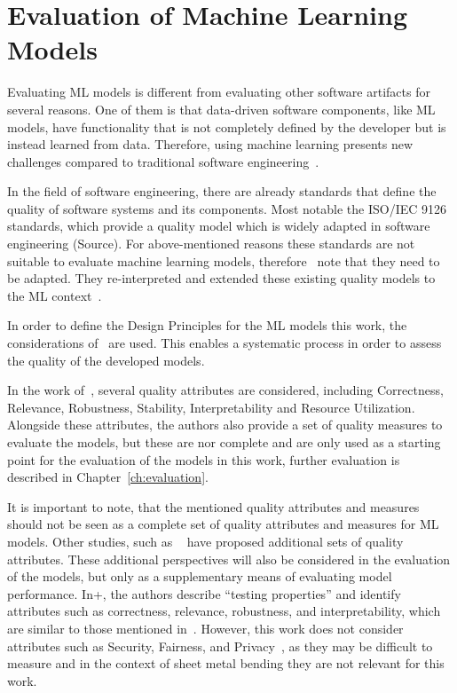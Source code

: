 \section{Evaluation of Machine Learning Models}\label{sec:evaluation-of-machine-learning-models}
Evaluating \ac{ML} models is different from evaluating other software artifacts for several reasons.
One of them is that data-driven software components, like \ac{ML} models, have functionality that
is not completely defined by the developer but is instead learned from data.
Therefore, using machine learning presents new challenges compared to traditional software
engineering~\cite[p. 2]{siebert2022construction}.

In the field of software engineering, there are already standards that define the quality of
software systems and its components.
Most notable the ISO/IEC 9126 standards, which provide a quality model which is widely adapted in
software engineering (Source).
For above-mentioned reasons these standards are not suitable to evaluate machine learning models,
therefore~\cite{siebert2022construction} note that they need to be adapted.
They re-interpreted and extended these existing quality models to the ML context~\cite[p.
1]{siebert2022construction}.

In order to define the Design Principles for the \ac{ML} models this work, the
considerations of~\cite[]{siebert2022construction} are used.
This enables a systematic process in order to assess the quality of the developed models.

In the work of~\cite{siebert2022construction}, several quality attributes are considered, including
Correctness, Relevance, Robustness, Stability, Interpretability and Resource
Utilization.
Alongside these attributes, the authors also provide a set of quality measures to evaluate the
models, but these are nor complete and are only used as a starting point for the evaluation of the
models in this work, further evaluation is described in Chapter~\ref{ch:evaluation}.

It is important to note, that the mentioned quality attributes and measures should
not be seen as a complete set of quality attributes and measures for \ac{ML} models.
Other studies, such as ~\cite{zhang2020machine} have proposed additional sets of quality attributes.
These additional perspectives will also be considered in the evaluation of the models, but only
as a supplementary means of evaluating model performance.
In+\cite{zhang2020machine}, the authors describe ``testing properties'' and identify attributes
such as correctness, relevance, robustness, and interpretability, which are similar to those
mentioned in~\cite{siebert2022construction}.
However, this work does not consider attributes such as Security, Fairness, and Privacy~\cite[p.
3]{zhang2020machine}, as they may be difficult to measure and in the context of sheet metal
bending they are not relevant for this work.


